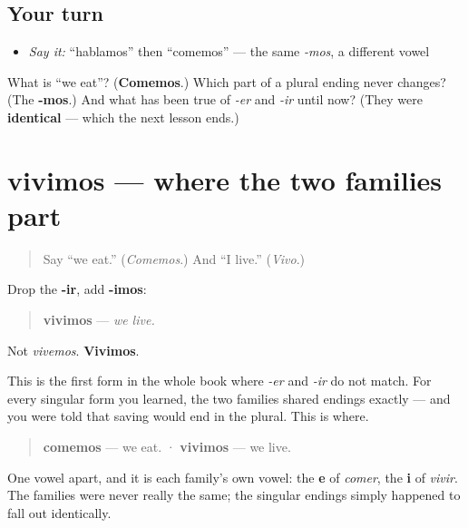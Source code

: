 \subsection*{Your turn}
\begin{itemize}
\raggedright
  \item \emph{Say it:} \textquotedblleft{}hablamos\textquotedblright{} then \textquotedblleft{}comemos\textquotedblright{} — the same \emph{-mos}, a different vowel
\end{itemize}

\begin{tcolorbox}[breakable,colback=teal!4,colframe=teal!35!black,title={Before you move on}]
What is \textquotedblleft{}we eat\textquotedblright{}? (\textbf{Comemos}.) Which part of a plural ending never changes? (The \textbf{-mos}.) And what has been true of \emph{-er} and \emph{-ir} until now? (They were \textbf{identical} — which the next lesson ends.)
\end{tcolorbox}
\section[vivimos]{vivimos — where the two families part}

\label{lesson:ES-C07-vivimos}



\begin{quote}
Say \textquotedblleft{}we eat.\textquotedblright{} (\emph{Comemos}.) And \textquotedblleft{}I live.\textquotedblright{} (\emph{Vivo}.)
\end{quote}

\begin{grammarlens}[title={Grammar Lens: the saving ends here}]
Drop the \textbf{-ir}, add \textbf{-imos}:

\begin{quote}
\textbf{vivimos} — \emph{we live.}
\end{quote}

Not \emph{vivemos}. \textbf{Vivimos}.

This is the first form in the whole book where \emph{-er} and \emph{-ir} do not match. For every singular form you learned, the two families shared endings exactly — and you were told that saving would end in the plural. This is where.

\begin{quote}
\textbf{comemos} — we eat.  ·  \textbf{vivimos} — we live.
\end{quote}

One vowel apart, and it is each family's own vowel: the \textbf{e} of \emph{comer}, the \textbf{i} of \emph{vivir}. The families were never really the same; the singular endings simply happened to fall out identically.
\end{grammarlens}

